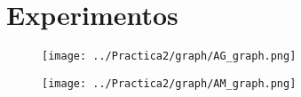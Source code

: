 \newpage

\section{Experimentos}

\begin{figure}[h]
   \centering
   \texttt{[image: ../Practica2/graph/AG\_graph.png]}
   \caption{}
\end{figure}

\begin{figure}[h]
   \centering
   \texttt{[image: ../Practica2/graph/AM\_graph.png]}
   \caption{}
\end{figure}
